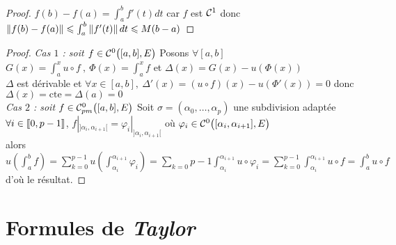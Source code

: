     
    
    
    \begin{proof}
    $f(b)-f(a) = \int_a^b f'(t) dt $ car $f$ est ${\mathcal{C}}^1$ donc $\left\Vert f(b)-f(a) \right\Vert \leqslant \int_a^b \left\Vert f'(t) \right\Vert dt \leqslant M(b-a)$
    \end{proof} \medskip
    
    
    \begin{proof}
    \emph{Cas $1$ : soit $f\in{\mathcal{C}}^0 \big( [a,b] ,E \big)$} Posons $\forall[a,b]$\\ 
    $G(x) = \int_a^x u\circ f ~,~ \Phi (x) = \int_a^x f$ et $\Delta (x) = G(x) - u(\Phi (x)) $ \\ 
    $\Delta$ est dérivable et $\forall x\in [a,b] , ~\Delta'(x) = (u\circ f)(x) - u(\Phi'(x)) = 0$ donc $\Delta (x) = \mathrm{cte} = \Delta (a) =0$ \\ 
    \emph{Cas $2$ : soit $f\in{\mathcal{C}_{pm}^0} \big( [a,b] ,E \big)$} Soit $\sigma = (\alpha_0 , \dots ,\alpha_p)$ une subdivision adaptée \\
    $\forall i\in {\llbracket 0,p-1 \rrbracket}$, $f|_{]\alpha_i , \alpha_{i+1}[} = \varphi_i|_{]\alpha_i , \alpha_{i+1}[}$ où $\varphi_i \in {\mathcal{C}}^0 \big( [\alpha_i , \alpha_{i+1} ],E\big) $\\ 
    alors $u\left( \int_a^b f\right) = \sum_{k=0}^{p-1} u\left( \int_{\alpha_i}^{\alpha_{i+1}} \varphi_i \right) = \sum_{k=0}{p-1} \int_{\alpha_i}^{\alpha_{i+1}} u\circ \varphi_i = \sum_{k=0}^{p-1} \int_{\alpha_i}^{\alpha_{i+1}} u\circ f =\int_a^b u\circ f$ d'où le résultat.
    \end{proof} \medskip
    
    
\section{Formules de \emph{Taylor}}

